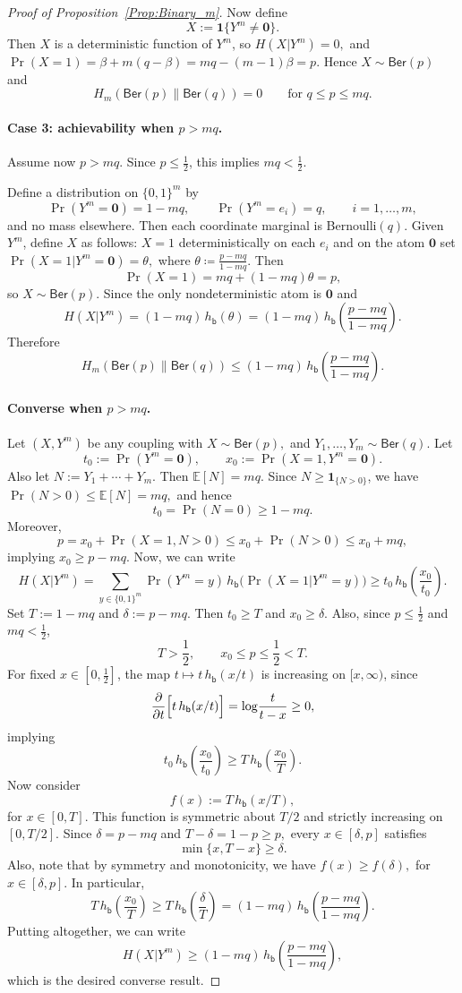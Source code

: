 \documentclass[journal]{IEEEtran}
\newcommand{\1}{\mathbf{1}}
\newcommand{\Ber}{\mathsf{Ber}}
\begin{document}
\begin{proof}[Proof of Proposition~\ref{Prop:Binary_m}]
Now define
\[X:=\mathbf 1\{Y^m\neq \mathbf 0\}.\]
Then $X$ is a deterministic function of $Y^m$, so \(H(X| Y^m)=0,\)
and \(\Pr(X=1)=\beta+m(q-\beta)=mq-(m-1)\beta=p.\) Hence $X\sim\Ber(p)$ and
\[H_m(\Ber(p)\|\Ber(q))=0
\qquad\text{for }q\le p\le mq.\]

\paragraph{Case 3: achievability when $p>mq$.}
Assume now $p>mq$. Since $p\le \frac12$, this implies $mq<\frac12$.

Define a distribution on $\{0, 1\}^m$ by  \[\Pr(Y^m=\mathbf 0)=1-mq,\qquad \Pr(Y^m=e_i)=q,\qquad i=1,\dots,m,\]
and no mass elsewhere. Then each coordinate marginal is Bernoulli$(q)$.
Given $Y^m$, define $X$ as follows: \(X=1\) deterministically on each \(e_i\) and on the atom $\mathbf 0$ set \(\Pr(X=1| Y^m=\mathbf 0)=\theta,\)
where $\theta\coloneqq \frac{p-mq}{1-mq}.$ Then
\[\Pr(X=1)=mq+(1-mq)\theta=p,\]
so $X\sim\Ber(p)$. Since the only nondeterministic atom is $\mathbf 0$ and 
\[H(X| Y^m)=(1-mq)\,h_{\mathsf{b}}(\theta)=(1-mq)\,h_{\mathsf{b}}\!\left(\frac{p-mq}{1-mq}\right).\]
Therefore
\[H_m(\Ber(p)\|\Ber(q))\le(1-mq)\,h_{\mathsf{b}}\!\left(\frac{p-mq}{1-mq}\right).\]

\paragraph{Converse when $p>mq$.}
Let $(X,Y^m)$ be any coupling with \(X\sim\Ber(p),\) and  \(Y_1,\dots,Y_m\sim\Ber(q).\)
Let
\[t_0:=\Pr(Y^m=\mathbf 0),\qquad x_0:=\Pr(X=1,Y^m=\mathbf 0).\]
Also let \(N:=Y_1+\cdots+Y_m.\)
Then $\mathbb E[N]=mq.$ Since $N\ge \mathbf 1_{\{N>0\}}$, we have  \(\Pr(N>0)\le \mathbb E[N]=mq,\) and hence
\[t_0=\Pr(N=0)\ge 1-mq.\]
Moreover,
\[p=x_0+\Pr(X=1,N>0)\le x_0+\Pr(N>0)\le x_0+mq,\]
implying \(x_0\ge p-mq.\) Now, we can write 
\[H(X| Y^m)=\sum_{y\in\{0,1\}^m}\Pr(Y^m=y)\,
h_{\mathsf{b}}\!\bigl(\Pr(X=1| Y^m=y)\bigr)\ge t_0\,h_{\mathsf{b}}\!\left(\frac{x_0}{t_0}\right).\]
Set \(T:=1-mq\) and \(\delta:=p-mq.\)
Then $t_0\ge T$ and $x_0\ge \delta$. Also, since $p\le \frac12$ and $mq<\frac12$,
\[T> \frac12,\qquad x_0\le p\le \frac12<T.\]
For fixed $x\in[0,\frac12]$, the map \(t\mapsto t\,h_{\mathsf{b}}(x/t)\)
is increasing on $[x,\infty)$, since
\[\frac{\partial}{\partial t}\Bigl[t\,h_{\mathsf{b}}(x/t)\Bigr]=\log\!\frac{t}{t-x}\ge 0,\]
implying 
\[t_0\,h_{\mathsf{b}}\!\left(\frac{x_0}{t_0}\right)\ge
T\,h_{\mathsf{b}}\!\left(\frac{x_0}{T}\right).\]
Now consider
\[f(x):=T\,h_{\mathsf{b}}(x/T),\]
for $x\in[0,T]$. This function is symmetric about $T/2$ and strictly increasing on $[0,T/2]$. Since \(\delta=p-mq\) and \(T-\delta=1-p\ge p,\) every $x\in[\delta,p]$ satisfies \[\min\{x,T-x\}\ge \delta.\]
Also, note that by symmetry and monotonicity, we have
\(f(x)\ge f(\delta),\) for $x\in[\delta,p]$. In particular,
\[T\,h_{\mathsf{b}}\!\left(\frac{x_0}{T}\right)\ge T\,h_{\mathsf{b}}\!\left(\frac{\delta}{T}\right)=(1-mq)\,h_{\mathsf{b}}\!\left(\frac{p-mq}{1-mq}\right).\]
Putting altogether, we can write
\[H(X| Y^m)\ge(1-mq)\,h_{\mathsf{b}}\!\left(\frac{p-mq}{1-mq}\right),\]
which is the desired converse result. 


\end{proof}
\end{document}
